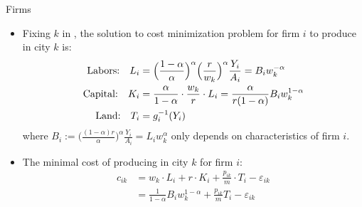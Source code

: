 \documentclass[xcolor={dvipsnames}]{beamer}
\makeatletter
\theoremstyle{plain}
\renewcommand\eqref[1]{%
  \textup{\usebeamercolor[fg]{structure}\tagform@{\ref{#1}}}%
}
\makeatother
\begin{document}
\begin{frame}{Firms}
    \begin{itemize}
        \item Fixing $k$ in \eqref{firm_minimization1}, the solution to cost minimization problem
              for firm $i$ to produce in city $k$ is:
              \begin{equation}
                  \begin{aligned}
                      \text{Labors:\quad}
                      L_i & =
                      \Big(\frac{1-\alpha}{\alpha}\Big)^{\alpha}\Big(\frac{r}{w_k}\Big)
                      ^{\alpha}\frac{Y_i}{A_i} = B_{i} w_{k}^{-\alpha}             \\
                      \text{Capital:\quad}
                      K_i & = \frac{\alpha}{1-\alpha}\cdot \frac{w_k}{r} \cdot L_i
                      =\frac{\alpha }{r(1-\alpha)} B_{i} w_{k}^{1-\alpha}          \\
                      \text{Land:\quad}
                      T_i & = g_{i}^{-1}(Y_i)                                      \\
                  \end{aligned}
                  \label{min_solution}
              \end{equation}
              where $B_i:=\Big(\frac{(1-\alpha)r}{\alpha}\Big)^{\alpha}\frac{Y_i}{A_i}
                  =L_{i}w_{k}^{\alpha}$ only depends on characteristics of firm $i$.
        \item The minimal cost of producing in city $k$ for firm $i$:
              \begin{equation}
                  \begin{aligned}
                      c_{ik} & = w_k \cdot L_{i} + r \cdot K_{i}
                      + \frac{p_{ik}}{m} \cdot T_{i} - \varepsilon_{ik}  \\
                             & = \frac{1}{1-\alpha}B_{i}w_{k}^{1-\alpha}
                      + \frac{p_{ik}}{m}T_{i} - \varepsilon_{ik}
                  \end{aligned}
                  \label{city_cost}
              \end{equation}
    \end{itemize}
\end{frame}
\end{document}
